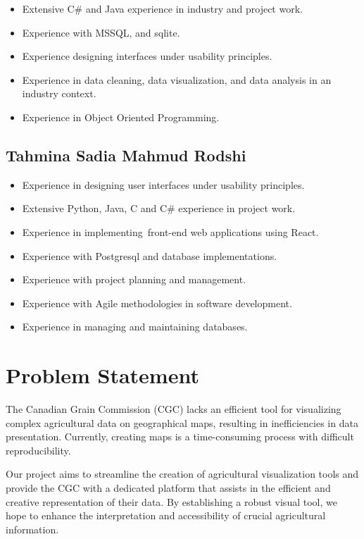 \documentclass[12pt]{article}
\begin{document}
\begin{itemize}
    \item Extensive C\# and Java experience in industry and project work. 
    \item Experience with MSSQL, and sqlite. 
    \item Experience designing interfaces under usability principles. 
    \item Experience in data cleaning, data visualization, and data analysis in an industry context. 
    \item Experience in Object Oriented Programming. 
\end{itemize}
{\tiny\subsection*{Tahmina Sadia Mahmud Rodshi}}
\begin{itemize}
    \item Experience in designing user interfaces under usability principles. 
    \item Extensive Python, Java, C and C\# experience in project work. 
    \item Experience in implementing front-end web applications using React.
    \item Experience with Postgresql and database implementations.
    \item Experience with project planning and management. 
    \item Experience with Agile methodologies in software development.
    \item Experience in managing and maintaining databases. 
\end{itemize}

\newpage
\section*{Problem Statement}
The Canadian Grain Commission (CGC) lacks an efficient tool for visualizing complex agricultural data on geographical maps, resulting in inefficiencies in data presentation. Currently, creating maps is a time-consuming process with difficult reproducibility. 

Our project aims to streamline the creation of agricultural visualization tools and provide the CGC with a dedicated platform that assists in the efficient and creative representation of their data. By establishing a robust visual tool, we hope to enhance the interpretation and accessibility of crucial agricultural information. 
\end{document}

